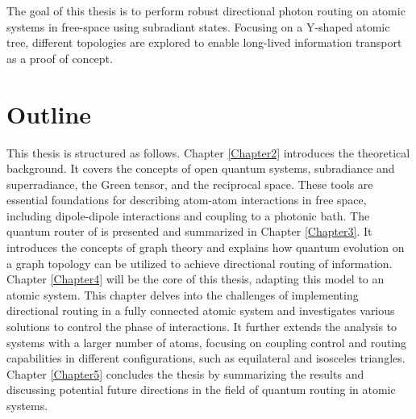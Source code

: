 \vspace{0.5cm}
\noindent
The goal of this thesis is
to perform robust directional photon routing on atomic systems in free-space using subradiant states.
Focusing on a Y-shaped atomic tree, different topologies are explored to enable long-lived information transport as a proof of concept.

    \section{Outline}
This thesis is structured as follows.
Chapter \ref{Chapter2} introduces the theoretical background.
It covers the concepts of open quantum systems,
subradiance and superradiance, the Green tensor, and the reciprocal space.
These tools are essential foundations for describing atom-atom interactions in free space,
including dipole-dipole interactions and coupling to a photonic bath.
The quantum router of \cite{Startingpoint} is presented and summarized in Chapter \ref{Chapter3}.
It introduces the concepts of graph theory and explains how quantum evolution on a graph topology can be utilized to achieve directional routing of information.
Chapter \ref{Chapter4} will be the core of this thesis, adapting this model to an atomic system.
This chapter delves into the challenges of implementing directional routing in a fully connected atomic system and investigates various solutions to control the phase of interactions.
It further extends the analysis to systems with a larger number of atoms, focusing on coupling control and routing capabilities in different configurations, such as equilateral and isosceles triangles.
Chapter \ref{Chapter5} concludes the thesis by summarizing the results and discussing potential future directions in the field of quantum routing in atomic systems.